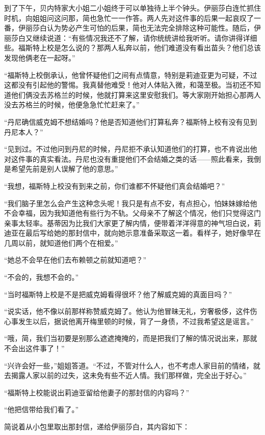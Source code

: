 \par 到了下午，贝内特家大小姐二小姐终于可以单独待上半个钟头。伊丽莎白连忙抓住时机，向姐姐问这问那，简也急忙一一作答。两人先对这件事的后果一起哀叹了一番，伊丽莎白认为势必产生可怕的后果，简也无法完全排除这种可能性。随后，伊丽莎白又继续说道：“有些情况我还不了解，请你统统讲给我听听。请你讲得详细些。福斯特上校是怎么说的？那两人私奔以前，他们难道没有看出苗头？他们总该发现他俩老在一起呀。”
\par “福斯特上校倒承认，他曾怀疑他们之间有点情意，特别是莉迪亚更为可疑，不过这都没有引起他的警惕。我真替他难受！他对人体贴入微，和蔼至极。当初还不知道他们俩没去苏格兰的时候，他就打算来这里安慰我们。等大家刚开始担心那两人没去苏格兰的时候，他便急急忙忙赶来了。”
\par “丹尼确信威克姆不想结婚吗？他是否知道他们打算私奔？福斯特上校有没有见到丹尼本人？”
\par “见到过。不过他问到丹尼的时候，丹尼拒不承认知道他们的打算，也不肯说出他对这件事的真实看法。丹尼也没有重提他们不会结婚之类的话——照此看来，我倒是希望先前是别人误解了他的意思。”
\par “我想，福斯特上校没有到来之前，你们谁都不怀疑他们真会结婚吧？”
\par “我们脑子里怎么会产生这种念头呢！我只是有点不安，有点担心，怕妹妹嫁给他不会幸福，因为我知道他有些行为不轨。父母亲不了解这个情况，他们只觉得这门亲事太轻率。基蒂因为比我们大家更了解内情，便带着洋洋得意的神气坦白说，莉迪亚在最后写给她的那封信中，就向她示意准备采取这一着。看样子，她好像早在几周以前，就知道他们两个在相爱。”
\par “她总不会早在他们去布赖顿之前就知道吧？”
\par “不会的，我想不会的。”
\par “当时福斯特上校是不是把威克姆看得很坏？他了解威克姆的真面目吗？”
\par “说实话，他不像以前那样称赞威克姆了。他认为他冒昧无礼，穷奢极侈，这件伤心事发生以后，据说他离开梅里顿的时候，背了一身债，不过我希望这是谣言。”
\par “哦，简，我们当初要是别那么遮遮掩掩的，而是把我们了解的情况说出来，那就不会出这件事了！”
\par “兴许会好一些，”姐姐答道。“不过，不管对什么人，也不考虑人家目前的情绪，就去揭露人家以前的过失，这未免有些不近人情。我们那样做，完全出于好心。”
\par “福斯特上校能说出莉迪亚留给他妻子的那封信的内容吗？”
\par “他把信带给我们看了。”
\par 简说着从小包里取出那封信，递给伊丽莎白，其内容如下：
